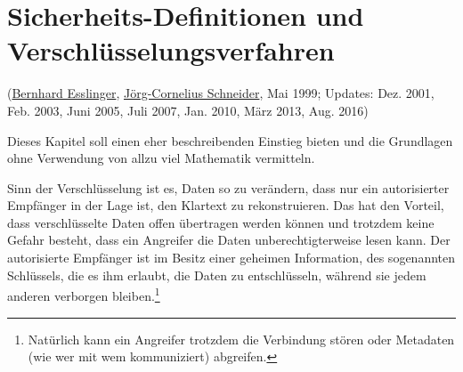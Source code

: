 
\begin{refsegment}


\hypertarget{Chapter_EncryptionSecDefinitions}{}

\chapter%
{Sicherheits-Definitionen und Verschlüsselungsverfahren}
\label{Chapter_EncryptionSecDefinitions}
(\hyperlink{author_Bernhard-Esslinger}{Bernhard Esslinger},
 \hyperlink{author_Joerg-Cornelius-Schneider}{Jörg-Cornelius Schneider},
 Mai 1999; Updates: Dez. 2001, Feb. 2003, Juni 2005, Juli 2007, Jan. 2010, März 2013, Aug. 2016)

Dieses Kapitel soll einen eher beschreibenden Einstieg bieten und die
Grundlagen ohne Verwendung von allzu viel Mathematik vermitteln.

Sinn der Verschlüsselung  ist es, Daten so zu
verändern, dass nur ein autorisierter Empfän\-ger in der Lage ist,
den Klartext zu rekonstruieren. Das hat den Vorteil, dass verschlüsselte
Daten offen übertragen werden können und trotzdem keine Gefahr besteht,
dass ein Angreifer die Daten unberechtigterweise lesen kann. Der
autorisierte Empfänger ist im Besitz einer geheimen Information, des
sogenannten Schlüssels, die es ihm erlaubt, die Daten zu entschlüsseln,
während sie jedem anderen verborgen bleiben.\footnote{%
  Natürlich kann ein Angreifer trotzdem die Verbindung stören oder
  Metadaten (wie wer mit wem kommuniziert) abgreifen.
}


\end{refsegment}
